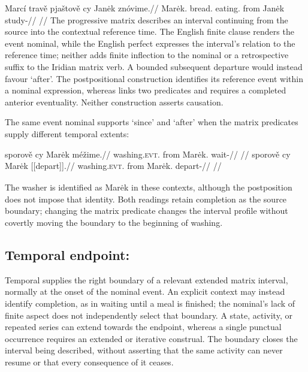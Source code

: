 \ex\label{ex:temporal-source}%
\begingl
\gla Marcí travě pjaštově cy Janėk znóvime.//
\glb Marėk.\Ind{} bread.\Ind{} eating.\Ind{} from Janėk study-\Prog{}//
\glft {}
//
\endgl
\xe
The progressive matrix describes an interval continuing from the source into
the contextual reference time. The English finite clause renders the event
nominal, while the English perfect expresses the interval's relation to the
reference time; neither adds finite inflection to the nominal or a
retrospective suffix to the Iridian matrix verb. A bounded subsequent
departure would instead favour `after'. The postpositional construction
identifies its reference event within a nominal expression, whereas 
links two predicates and requires a completed anterior eventuality. Neither
construction asserts causation.

The same event nominal supports `since' and `after' when the matrix
predicates supply different temporal extents:

\pex\label{ex:slot-source-extent}
\a
\begingl
\gla sporově cy Marėk méžime.//
\glb washing.\textsc{evt}.\Ind{} from Marėk.\Dir{} wait-\Prog{}//
\glft {}
//
\endgl
\a
\begingl
\gla sporově cy Marėk \textnormal{[[depart]]}\textsubscript{\Pf{}}.//
\glb washing.\textsc{evt}.\Ind{} from Marėk.\Dir{} depart-\Pf{}//
\glft {}
//
\endgl
\xe

The washer is identified as Marėk in these contexts, although the
postposition does not impose that identity. Both readings retain completion
as the source boundary; changing the matrix predicate changes the interval
profile without covertly moving the boundary to the beginning of washing.

\subsection{Temporal endpoint: }

Temporal  supplies the right boundary of a relevant extended matrix
interval, normally at the onset of the nominal event. An explicit context may
instead identify completion, as in waiting until a meal is finished; the
nominal's lack of finite aspect does not independently select that boundary.
A state, activity, or repeated series can extend towards the endpoint, whereas
a single punctual occurrence requires an extended or iterative construal.
The boundary closes the interval being described, without asserting that the
same activity can never resume or that every consequence of it ceases.

